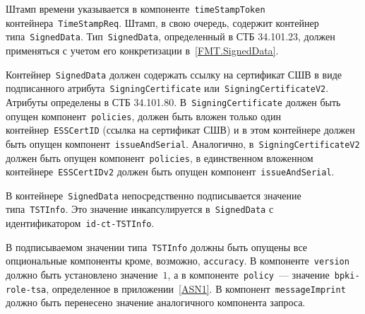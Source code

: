 Штамп времени указывается в компоненте~\texttt{timeStampToken}
контейнера~\texttt{TimeStampReq}. Штамп, в свою очередь, содержит 
контейнер типа~\texttt{SignedData}.
%
Тип~\texttt{SignedData}, определенный в СТБ 34.101.23, должен применяться с
учетом его конкретизации в~\ref{FMT.SignedData}.

Контейнер~\texttt{SignedData} должен содержать ссылку на сертификат СШВ
в виде подписанного атрибута~\texttt{SigningCertificate} 
или~\texttt{SigningCertificateV2}. Атрибуты определены в СТБ 34.101.80. 
%
В~\texttt{SigningCertificate} должен быть опущен 
компонент~\texttt{policies}, должен быть вложен только один 
контейнер~\texttt{ESSCertID} (ссылка на сертификат СШВ) и в этом 
контейнере должен быть опущен компонент~\texttt{issueAndSerial}.
%
Аналогично, в~\texttt{SigningCertificateV2} должен быть опущен 
компонент~\texttt{policies}, в единственном вложенном 
контейнере~\texttt{ESSCertIDv2} должен быть опущен 
компонент~\texttt{issueAndSerial}.

В контейнере~\texttt{SignedData} непосредственно подписывается 
значение типа~\texttt{TSTInfo}. Это значение инкапсулируется 
в~\texttt{SignedData} с идентификатором~\texttt{id-ct-TSTInfo}.

В подписываемом значении типа~\texttt{TSTInfo} должны быть опущены
все опциональные компоненты кроме, возможно, \texttt{accuracy}.
%
В компоненте~\texttt{version} должно быть установлено значение~$1$,
а в компоненте~\texttt{policy}~--- значение~\texttt{bpki-role-tsa},
определенное в приложении~\ref{ASN1}.
%
В компонент~\texttt{messageImprint} должно быть перенесено
значение аналогичного компонента запроса.

